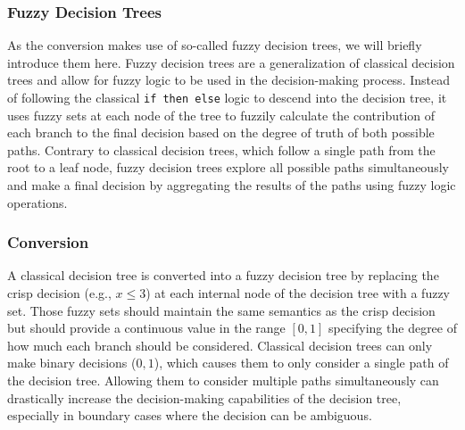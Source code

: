\subsubsection{Fuzzy Decision Trees}

As the conversion makes use of so-called fuzzy decision trees, we will briefly introduce them here. Fuzzy decision trees are a generalization of classical decision trees and allow for fuzzy logic to be used in the decision-making process. Instead of following the classical \texttt{if then else} logic to descend into the decision tree, it uses fuzzy sets at each node of the tree to fuzzily calculate the contribution of each branch to the final decision based on the degree of truth of both possible paths. Contrary to classical decision trees, which follow a single path from the root to a leaf node, fuzzy decision trees explore all possible paths simultaneously and make a final decision by aggregating the results of the paths using fuzzy logic operations.

\subsubsection{Conversion}


A classical decision tree is converted into a fuzzy decision tree by replacing the crisp decision (e.g., $x \leq 3$) at each internal node of the decision tree with a fuzzy set. Those fuzzy sets should maintain the same semantics as the crisp decision but should provide a continuous value in the range $[0,1]$ specifying the degree of how much each branch should be considered. Classical decision trees can only make binary decisions (${0,1}$), which causes them to only consider a single path of the decision tree. Allowing them to consider multiple paths simultaneously can drastically increase the decision-making capabilities of the decision tree, especially in boundary cases where the decision can be ambiguous.


